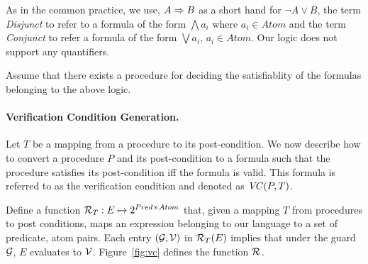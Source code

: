 As in the common practice, we use, $A \Rightarrow B$ as a short hand for $\neg A \vee B$,
the term \textit{Disjunct} to refer to a  formula of the form $\bigwedge a_i$ where $a_i \in Atom$
and the term \textit{Conjunct} to refer a formula of the form $\bigvee a_i$, $a_i \in Atom$.
Our logic does not support any quantifiers.

Assume that there exists a procedure for deciding the satisfiablity of the formulas 
belonging to the above logic.

\paragraph{Verification Condition Generation.}

Let $T$ be a mapping from a procedure to its post-condition.
We now describe how to convert a procedure $P$ and its post-condition to a formula 
such that the procedure satisfies its post-condition iff the formula is valid. 
This formula is referred to as the verification condition and denoted as $\mathit{VC}(P,T)$.

Define a function $\mathcal{R}_{T}: E \mapsto 2^{Pred \times Atom}$ 
that, given a mapping $T$ from procedures to post conditions, 
maps an expression belonging to our language to a set of predicate, atom pairs. 
Each entry $(\mathcal{G},\mathcal{V})$ in $\mathcal{R}_{T}(E)$ implies that under the guard $\mathcal{G}$,
$E$ evaluates to $\mathcal{V}$.
Figure~\ref{fig:vc} defines the function $\mathcal{R}_{}$.

